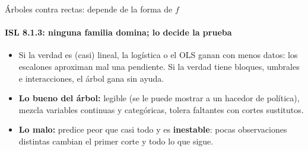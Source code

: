 \documentclass{beamer}
\newcommand{\1}{\mathbb{I}}
\begin{document}
\begin{frame}{Árboles contra rectas: depende de la forma de $f$}
\framesubtitle{ISL 8.1.3: ninguna familia domina; lo decide la prueba}
\small
\begin{center}
\end{center}
\pause
\begin{itemize}\itemsep3pt
  \item Si la verdad es (casi) lineal, la logística o el OLS ganan con menos datos: los escalones aproximan mal una pendiente. Si la verdad tiene bloques, umbrales e interacciones, el árbol gana sin ayuda.
  \item \textbf{Lo bueno del árbol:} legible (se le puede mostrar a un hacedor de política), mezcla variables continuas y categóricas, tolera faltantes con cortes sustitutos.
  \item \textbf{Lo malo:} predice peor que casi todo y es \textbf{inestable}: pocas observaciones distintas cambian el primer corte y todo lo que sigue.
\end{itemize}
\end{frame}
\end{document}
